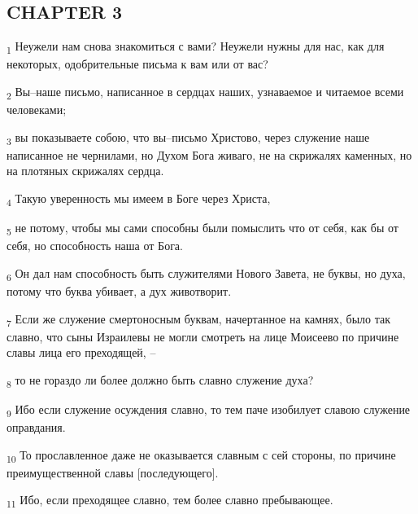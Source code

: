 \subsection{CHAPTER 3}
\begin{tcolorbox}
\textsubscript{1} Неужели нам снова знакомиться с вами? Неужели нужны для нас, как для некоторых, одобрительные письма к вам или от вас?
\end{tcolorbox}
\begin{tcolorbox}
\textsubscript{2} Вы--наше письмо, написанное в сердцах наших, узнаваемое и читаемое всеми человеками;
\end{tcolorbox}
\begin{tcolorbox}
\textsubscript{3} вы показываете собою, что вы--письмо Христово, через служение наше написанное не чернилами, но Духом Бога живаго, не на скрижалях каменных, но на плотяных скрижалях сердца.
\end{tcolorbox}
\begin{tcolorbox}
\textsubscript{4} Такую уверенность мы имеем в Боге через Христа,
\end{tcolorbox}
\begin{tcolorbox}
\textsubscript{5} не потому, чтобы мы сами способны были помыслить что от себя, как бы от себя, но способность наша от Бога.
\end{tcolorbox}
\begin{tcolorbox}
\textsubscript{6} Он дал нам способность быть служителями Нового Завета, не буквы, но духа, потому что буква убивает, а дух животворит.
\end{tcolorbox}
\begin{tcolorbox}
\textsubscript{7} Если же служение смертоносным буквам, начертанное на камнях, было так славно, что сыны Израилевы не могли смотреть на лице Моисеево по причине славы лица его преходящей, --
\end{tcolorbox}
\begin{tcolorbox}
\textsubscript{8} то не гораздо ли более должно быть славно служение духа?
\end{tcolorbox}
\begin{tcolorbox}
\textsubscript{9} Ибо если служение осуждения славно, то тем паче изобилует славою служение оправдания.
\end{tcolorbox}
\begin{tcolorbox}
\textsubscript{10} То прославленное даже не оказывается славным с сей стороны, по причине преимущественной славы [последующего].
\end{tcolorbox}
\begin{tcolorbox}
\textsubscript{11} Ибо, если преходящее славно, тем более славно пребывающее.
\end{tcolorbox}
